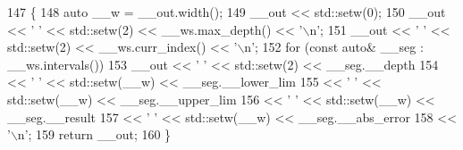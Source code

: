 \begin{DoxyCode}
147     \{
148       \textcolor{keyword}{auto} \_\_w = \_\_out.width();
149       \_\_out << std::setw(0);
150       \_\_out << \textcolor{charliteral}{' '} << std::setw(2) << \_\_ws.max\_depth() << \textcolor{charliteral}{'\(\backslash\)n'};
151       \_\_out << \textcolor{charliteral}{' '} << std::setw(2) << \_\_ws.curr\_index() << \textcolor{charliteral}{'\(\backslash\)n'};
152       \textcolor{keywordflow}{for} (\textcolor{keyword}{const} \textcolor{keyword}{auto}& \_\_seg : \_\_ws.intervals())
153         \_\_out << \textcolor{charliteral}{' '} << std::setw(2) << \_\_seg.\_\_depth
154               << \textcolor{charliteral}{' '} << std::setw(\_\_w) << \_\_seg.\_\_lower\_lim
155               << \textcolor{charliteral}{' '} << std::setw(\_\_w) << \_\_seg.\_\_upper\_lim
156               << \textcolor{charliteral}{' '} << std::setw(\_\_w) << \_\_seg.\_\_result
157               << \textcolor{charliteral}{' '} << std::setw(\_\_w) << \_\_seg.\_\_abs\_error
158               << \textcolor{charliteral}{'\(\backslash\)n'};
159       \textcolor{keywordflow}{return} \_\_out;
160     \}
\end{DoxyCode}
\mbox{\label{namespace____gnu__cxx_a0057094f91787fe6b44af139bc118a5d}} 
